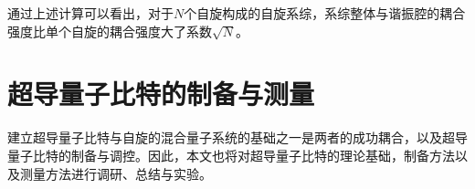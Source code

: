             
           通过上述计算可以看出，对于$N$个自旋构成的自旋系综，系综整体与谐振腔的耦合强度比单个自旋的耦合强度大了系数$\sqrt N$。 
            




        \section{超导量子比特的制备与测量} %
        \label{sec:fabrication_characterization}
            
            建立超导量子比特与自旋的混合量子系统的基础之一是两者的成功耦合，以及超导量子比特的制备与调控。因此，本文也将对超导量子比特的理论基础\cite{schuster2007circuit,koch2007charge}，制备方法\cite{krantz2010investigation,kelly2015fault}以及测量方法\cite{weber2016quantum}进行调研、总结与实验。

